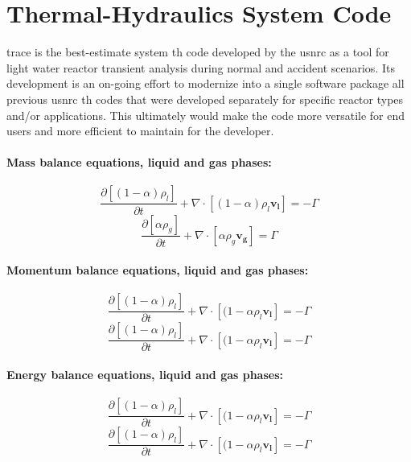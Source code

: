 \section{Thermal-Hydraulics System Code }\label{sec:reflood_trace}

\gls{trace} is the best-estimate system \gls{th} code developed by the \gls{usnrc} 
as a tool for light water reactor transient analysis during normal and accident scenarios.
Its development is an on-going effort 
to modernize into a single software package all previous \gls{usnrc} \gls{th} codes
that were developed separately for specific reactor types and/or applications.
This ultimately would make the code more versatile for end users and more efficient to maintain for the developer.

\paragraph{Mass balance equations, liquid and gas phases:}
\begin{equation}
	\frac{\partial [(1-\alpha)\rho_l]}{\partial t} + \nabla \cdot [(1-\alpha) \rho_l \mathbf{v_l}] = - \Gamma
\label{eq:mass_balance_liquid}
\end{equation}
\begin{equation}
	\frac{\partial [\alpha \rho_g]}{\partial t} + \nabla \cdot [\alpha \rho_g \mathbf{v_g}] = \Gamma
\label{eq:mass_balance_gas}
\end{equation}

\paragraph{Momentum balance equations, liquid and gas phases:}
\begin{equation}
	\frac{\partial [(1-\alpha)\rho_l]}{\partial t} + \nabla \cdot [(1-\alpha \rho_l \mathbf{v_l}] = - \Gamma
\label{eq:}
\end{equation}
\begin{equation}
	\frac{\partial [(1-\alpha)\rho_l]}{\partial t} + \nabla \cdot [(1-\alpha \rho_l \mathbf{v_l}] = - \Gamma
\label{eq:}
\end{equation}

\paragraph{Energy balance equations, liquid and gas phases:}
\begin{equation}
	\frac{\partial [(1-\alpha)\rho_l]}{\partial t} + \nabla \cdot [(1-\alpha \rho_l \mathbf{v_l}] = - \Gamma
\label{eq:}
\end{equation}
\begin{equation}
	\frac{\partial [(1-\alpha)\rho_l]}{\partial t} + \nabla \cdot [(1-\alpha \rho_l \mathbf{v_l}] = - \Gamma
\label{eq:}
\end{equation}